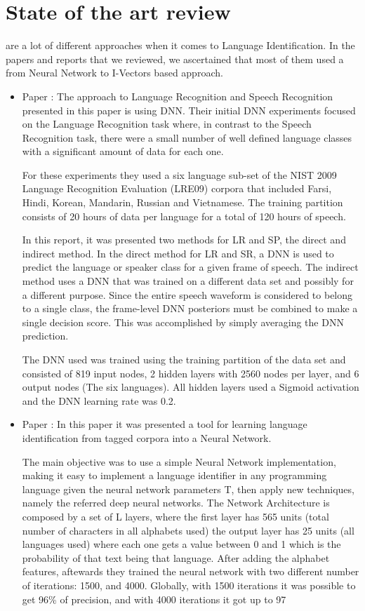 \documentclass[journal, a4paper]{IEEEtran}
\begin{document}
\section{State of the art review}
   are a lot of different approaches when it comes to Language Identification.
  In the papers and reports that we reviewed, we ascertained that most of them used a from Neural Network to I-Vectors based approach.
  \begin{itemize}
      \item Paper \cite{1} : The approach to Language Recognition and Speech Recognition 
presented in this paper is using DNN. Their initial DNN experiments focused on 
the Language Recognition task where, in contrast to the Speech Recognition task, 
there were a small number of well defined language classes with a significant 
amount of data for each one.

        For these experiments they used a six language sub-set of the NIST 2009 Language 
Recognition Evaluation (LRE09) corpora that included Farsi, Hindi, Korean, 
Mandarin, Russian and Vietnamese. The training partition consists of 20 hours of 
data per language for a total of 120 hours of speech.

        In this report, it was presented two methods for LR and SP, the direct and 
indirect method. In the direct method for LR and SR, a DNN is used to predict the 
language or speaker class for a given frame of speech. The indirect method uses a 
DNN that was trained on a different data set and possibly for a different purpose. Since 
the entire speech waveform is considered to belong to a single class, the frame-level 
DNN posteriors must be combined to make a single decision score. This was accomplished 
by simply averaging the DNN prediction.

        The DNN used was trained using the training partition of the data set and 
consisted of 819 input nodes, 2 hidden layers with 2560 nodes per layer, and 6 output 
nodes (The six languages). All hidden layers used a Sigmoid activation and the DNN 
learning rate was 0.2.
        \item Paper \cite{2}: In this paper it was presented a tool for learning 
language identification from tagged corpora into a Neural Network.

        The main objective was to use a simple Neural Network implementation, making 
it easy to implement a language identifier in any programming language given the 
neural network parameters T, then apply new techniques, namely the referred deep 
neural networks. The Network Architecture is composed by a set of L layers, where 
the first layer has 565 units (total number of characters in all alphabets used) the 
output layer has 25 units (all languages used) where each one gets a value between 0 
and 1 which is the probability of that text being that language.
  After adding the alphabet features, aftewards they trained the neural network with two different
number of iterations: 1500, and 4000. Globally, with 1500 iterations it was possible to get 96\% of
precision, and with 4000 iterations it got up to 97%


\end{itemize}
\end{document}
